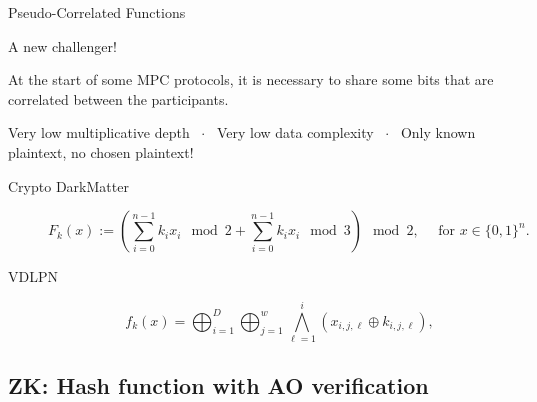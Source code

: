 \documentclass[presentation,aspectratio=1610]{beamer}
\begin{document}
\begin{frame}{Pseudo-Correlated Functions}

  \begin{exampleblock}{A new challenger!}
    {\small 
      At the start of some MPC protocols, it is necessary to share some
      bits that are correlated between the participants.

      \begin{center}
        Very low multiplicative depth ~$\cdot$~ \pause
        Very low data complexity ~$\cdot$~ \pause
        \alert{Only known plaintext, no chosen plaintext!}
      \end{center}
    }
  \end{exampleblock}

  \pause
  
  \begin{description}
  \item [Crypto DarkMatter] \cite{TCC:BIPSW18}
    \begin{equation*}
      F_k(x) := \left(\sum_{i = 0}^{n-1} k_i x_i \mod 2 + \sum_{i = 0}^{n-1} k_i x_i \mod 3\right) \mod{2}, \quad \text{ for } x \in \{0,1\}^n.  
    \end{equation*}

    \pause
  \item [VDLPN] \cite{add:BCGI+20}
    \begin{equation*}
      f_k(x) = \bigoplus_{i=1}^D \bigoplus_{j=1}^w\bigwedge_{\ell=1}^i (x_{i,j,\ell} \oplus k_{i,j,\ell}),
    \end{equation*}
  \end{description}
\end{frame}


\subsection{ZK: Hash function with AO verification}
\end{document}
